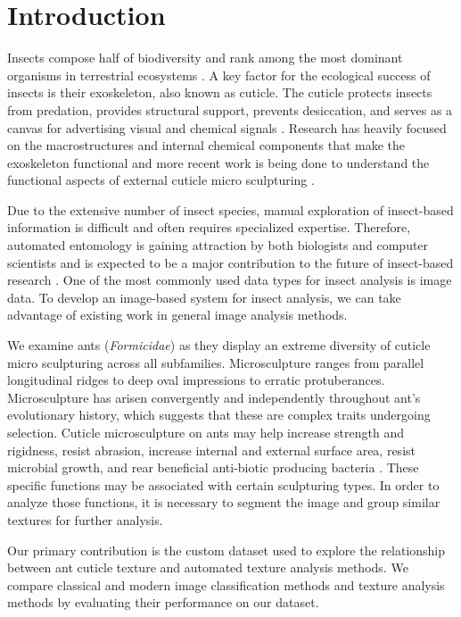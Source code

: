 \documentclass{aci}
\numberwithin{equation}{section}
\begin{document}
\section{Introduction}

Insects compose half of biodiversity and rank among the most dominant organisms
in terrestrial ecosystems \cite{sheikh_diverse_2017}. A key factor for the
ecological success of insects is their exoskeleton, also known as cuticle. The
cuticle protects insects from predation, provides structural support, prevents
desiccation, and serves as a canvas for advertising visual and chemical signals
\cite{gullan_insects_2009}. Research has heavily focused on the macrostructures
and internal chemical components that make the exoskeleton functional and more
recent work is being done to understand the functional aspects of external
cuticle micro sculpturing \cite{muthukrishnan_insect_2020,
    gunderson_insect_1989, watson_diversity_2017}.

Due to the extensive number of insect species, manual exploration of
insect-based information is difficult and often requires specialized expertise.
Therefore, automated entomology is gaining attraction by both biologists and
computer scientists and is expected to be a major contribution to the future of
insect-based research \cite{martineau_survey_2017}. One of the most commonly
used data types for insect analysis is image data. To develop an image-based
system for insect analysis, we can take advantage of existing work in general
image analysis methods.

We examine ants (\textit{Formicidae}) as they display an extreme diversity of
cuticle micro sculpturing across all subfamilies. Microsculpture ranges from
parallel longitudinal ridges to deep oval impressions to erratic protuberances.
Microsculpture has arisen convergently and independently throughout ant's
evolutionary history, which suggests  that these are complex traits undergoing
selection. Cuticle microsculpture on ants may help increase strength and
rigidness, resist abrasion, increase internal and external surface area, resist
microbial growth, and rear beneficial anti-biotic producing bacteria
\cite{johnson_effect_2011, bruckner_relationship_2017, currie_coevolved_2006}.
These specific functions may be associated with certain sculpturing types. In
order to analyze those functions, it is necessary to segment the image and group
similar textures for further analysis.

Our primary contribution is the custom dataset used to explore the relationship
between ant cuticle texture and automated texture analysis methods. We compare
classical and modern image classification methods and texture analysis methods
by evaluating their performance on our dataset.
\end{document}
